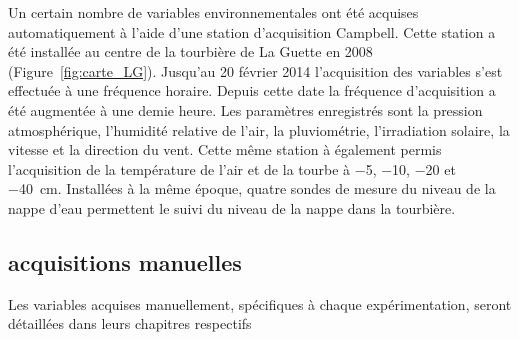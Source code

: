 Un certain nombre de variables environnementales ont été acquises automatiquement à l'aide d'une station d'acquisition Campbell\textsuperscript{\textregistered}.
Cette station a été installée au centre de la tourbière de La Guette en 2008 (Figure~\ref{fig:carte_LG}).
Jusqu'au 20 février 2014 l'acquisition des variables s'est effectuée à une fréquence horaire.
Depuis cette date la fréquence d'acquisition a été augmentée à une demie heure.
Les paramètres enregistrés sont la pression atmosphérique, l'humidité relative de l'air, la pluviométrie, l'irradiation solaire, la vitesse et la direction du vent. 
Cette même station à également permis l'acquisition de la température de l'air et de la tourbe à \num{-5}, \num{-10}, \num{-20} et \SIlist{-40}{\cm}.
Installées à la même époque, quatre sondes de mesure du niveau de la nappe d'eau permettent le suivi du niveau de la nappe dans la tourbière.

\subsection{acquisitions manuelles}

Les variables acquises manuellement, spécifiques à chaque expérimentation, seront détaillées dans leurs chapitres respectifs



